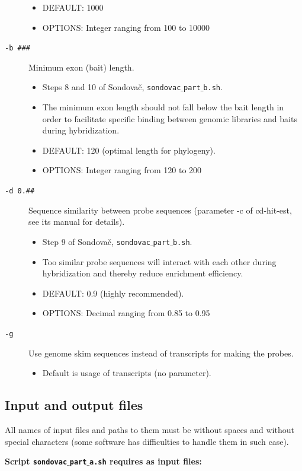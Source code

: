 \documentclass[a4paper, 11pt, twoside]{article}
\begin{document}
\begin{description}
\begin{itemize}
    \item DEFAULT: 1000
    \item OPTIONS: Integer ranging from 100 to 10000
  \end{itemize}
\item[\texttt{-b \#\#\#}] Minimum exon (bait) length.
  \begin{itemize}
    \item Steps 8 and 10 of Sondovač, \texttt{sondovac$\_$part$\_$b.sh}.
    \item The minimum exon length should not fall below the bait length in order to facilitate specific binding between genomic libraries and baits during hybridization.
    \item DEFAULT: 120 (optimal length for phylogeny).
    \item OPTIONS: Integer ranging from 120 to 200
  \end{itemize}
\item[\texttt{-d 0.\#\#}] Sequence similarity between probe sequences (parameter -c of cd-hit-est, see its manual for details).
  \begin{itemize}
    \item Step 9 of Sondovač, \texttt{sondovac$\_$part$\_$b.sh}.
    \item Too similar probe sequences will interact with each other during hybridization and thereby reduce enrichment efficiency.
    \item DEFAULT: 0.9 (highly recommended).
    \item OPTIONS: Decimal ranging from 0.85 to 0.95
  \end{itemize}
\item[\texttt{-g}] Use genome skim sequences instead of transcripts for making the probes.
  \begin{itemize}
    \item Default is usage of transcripts (no parameter).
  \end{itemize}
\end{description}

\subsection{Input and output files}

All names of input files and paths to them must be without spaces and without special characters (some software has difficulties to handle them in such case).

\textbf{Script \texttt{sondovac$\_$part$\_$a.sh} requires as input files:}
\end{document}

